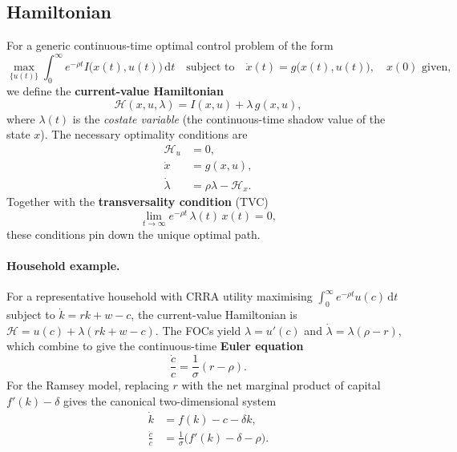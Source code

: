 \subsection{Hamiltonian}

For a generic continuous-time optimal control problem of the form
\begin{equation}
    \max_{\{u(t)\}} \int_0^\infty e^{-\rho t} I\bigl(x(t), u(t)\bigr)\,\mathrm{d}t
    \quad \text{subject to} \quad
    \dot{x}(t) = g\bigl(x(t), u(t)\bigr), \quad x(0) \text{ given},
\end{equation}
we define the \textbf{current-value Hamiltonian}
\begin{equation}
    \mathcal{H}(x, u, \lambda) = I(x, u) + \lambda\, g(x, u),
\end{equation}
where $\lambda(t)$ is the \emph{costate variable} (the continuous-time shadow value of the
state $x$). The necessary optimality conditions are
\begin{align}
    \mathcal{H}_u &= 0, \label{eq:foc_u}\\
    \dot{x} &= g(x, u), \label{eq:state}\\
    \dot{\lambda} &= \rho\lambda - \mathcal{H}_x. \label{eq:costate}
\end{align}
Together with the \textbf{transversality condition} (TVC)
\begin{equation}
    \lim_{t\to\infty} e^{-\rho t}\,\lambda(t)\,x(t) = 0,
\end{equation}
these conditions pin down the unique optimal path.

\paragraph{Household example.}
For a representative household with CRRA utility maximising
$\int_0^\infty e^{-\rho t} u(c)\,\mathrm{d}t$ subject to
$\dot{k} = rk + w - c$, the current-value Hamiltonian is
$\mathcal{H} = u(c) + \lambda(rk + w - c)$.
The FOCs yield $\lambda = u'(c)$ and $\dot{\lambda} = \lambda(\rho - r)$, which combine to
give the continuous-time \textbf{Euler equation}
\begin{equation}
    \frac{\dot{c}}{c} = \frac{1}{\sigma}(r - \rho).
\end{equation}
For the Ramsey model, replacing $r$ with the net marginal product of capital $f'(k)-\delta$
gives the canonical two-dimensional system
\begin{align}
    \dot{k} &= f(k) - c - \delta k, \\
    \frac{\dot{c}}{c} &= \frac{1}{\sigma}\bigl(f'(k) - \delta - \rho\bigr).
\end{align}


